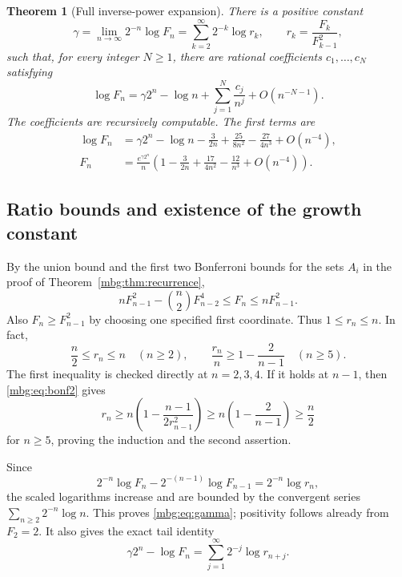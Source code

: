 \documentclass[11pt,letterpaper]{article}
\newtheorem{theorem}{Theorem}[section]
\theoremstyle{definition}
\begin{document}
\begin{theorem}[Full inverse-power expansion]
\label{mbg:thm:asymptotic}
There is a positive constant
\begin{equation}
 \gamma=\lim_{n\to\infty}2^{-n}\log F_n
        =\sum_{k=2}^\infty 2^{-k}\log r_k,
 \qquad r_k=\frac{F_k}{F_{k-1}^2},
 \label{mbg:eq:gamma}
\end{equation}
such that, for every integer $N\ge1$, there are rational coefficients $c_1,\ldots,c_N$ satisfying
\begin{equation}
 \log F_n=\gamma2^n-\log n+
           \sum_{j=1}^N\frac{c_j}{n^j}+O(n^{-N-1}).
 \label{mbg:eq:logasympt}
\end{equation}
The coefficients are recursively computable. The first terms are
\begin{align}
 \log F_n
 &=\gamma2^n-\log n-\frac{3}{2n}
        +\frac{25}{8n^2}-\frac{27}{4n^3}+O(n^{-4}),
 \label{mbg:eq:logfirst}\\
 F_n
 &=\frac{e^{\gamma2^n}}{n}
       \left(1-\frac{3}{2n}+\frac{17}{4n^2}
                       -\frac{12}{n^3}+O(n^{-4})\right).
 \label{mbg:eq:ffirst}
\end{align}
\end{theorem}

\subsection{Ratio bounds and existence of the growth constant}
By the union bound and the first two Bonferroni bounds for the sets $A_i$ in the proof of Theorem~\ref{mbg:thm:recurrence},
\begin{equation}
 nF_{n-1}^2-\binom n2F_{n-2}^4
       \le F_n\le nF_{n-1}^2.
 \label{mbg:eq:bonf2}
\end{equation}
Also $F_n\ge F_{n-1}^2$ by choosing one specified first coordinate. Thus $1\le r_n\le n$. In fact,
\begin{equation}
 \frac n2\le r_n\le n\quad(n\ge2),\qquad
 \frac{r_n}{n}\ge1-\frac{2}{n-1}\quad(n\ge5).
 \label{mbg:eq:rbound}
\end{equation}
The first inequality is checked directly at $n=2,3,4$. If it holds at $n-1$, then \eqref{mbg:eq:bonf2} gives
\[
 r_n\ge n\left(1-\frac{n-1}{2r_{n-1}^2}\right)
      \ge n\left(1-\frac2{n-1}\right)\ge\frac n2
\]
for $n\ge5$, proving the induction and the second assertion.

Since
\[
 2^{-n}\log F_n-2^{-(n-1)}\log F_{n-1}=2^{-n}\log r_n,
\]
the scaled logarithms increase and are bounded by the convergent series $\sum_{n\ge2}2^{-n}\log n$. This proves \eqref{mbg:eq:gamma}; positivity follows already from $F_2=2$. It also gives the exact tail identity
\begin{equation}
 \gamma2^n-\log F_n=\sum_{j=1}^\infty2^{-j}\log r_{n+j}.
 \label{mbg:eq:tail}
\end{equation}
\end{document}
